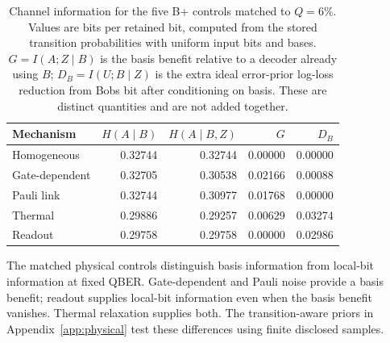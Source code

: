 \begin{table}[!htbp]
\centering
\small\setlength{\tabcolsep}{4pt}
\caption{Channel information for the five B+ controls matched to $Q=6\%$. Values are bits per retained bit, computed from the stored transition probabilities with uniform input bits and bases. $G=I(A;Z\mid B)$ is the basis benefit relative to a decoder already using $B$; $D_B=I(U;B\mid Z)$ is the extra ideal error-prior log-loss reduction from Bob\textquotesingle s bit after conditioning on basis. These are distinct quantities and are not added together.}
\label{tab:information}
\begin{tabular}{@{}lrrrr@{}}
\toprule
Mechanism & $H(A\mid B)$ & $H(A\mid B,Z)$ & $G$ & $D_B$ \\
\midrule
Homogeneous & 0.32744 & 0.32744 & 0.00000 & 0.00000 \\
Gate-dependent & 0.32705 & 0.30538 & 0.02166 & 0.00088 \\
Pauli link & 0.32744 & 0.30977 & 0.01768 & 0.00000 \\
Thermal & 0.29886 & 0.29257 & 0.00629 & 0.03274 \\
Readout & 0.29758 & 0.29758 & 0.00000 & 0.02986 \\
\bottomrule
\end{tabular}
\end{table}


The matched physical controls distinguish basis information from local-bit
information at fixed QBER. Gate-dependent and Pauli noise provide a basis
benefit; readout supplies local-bit information even when the basis benefit
vanishes. Thermal relaxation supplies both. The transition-aware priors in
Appendix~\ref{app:physical} test these differences using finite disclosed samples.

